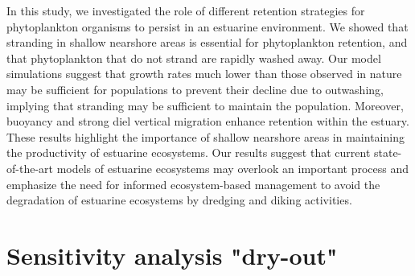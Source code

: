 \documentclass[npg, manuscript]{copernicus}
\begin{document}
\conclusions  %
In this study, we investigated the role of different retention strategies for phytoplankton organisms to persist in an estuarine environment.
We showed that stranding in shallow nearshore areas is essential for phytoplankton retention, and that phytoplankton that do not strand are rapidly washed away.
Our model simulations suggest that growth rates much lower than those observed in nature may be sufficient for populations to prevent their decline due to outwashing, implying that stranding may be sufficient to maintain the population.
Moreover, buoyancy and strong diel vertical migration enhance retention within the estuary.
These results highlight the importance of shallow nearshore areas in maintaining the productivity of estuarine ecosystems.
Our results suggest that current state-of-the-art models of estuarine ecosystems may overlook an important process and emphasize the need for informed ecosystem-based management to avoid the degradation of estuarine ecosystems by dredging and diking activities.














\appendix

\section{Sensitivity analysis "dry-out"}    %
\label{sec:dry-out}
\end{document}
